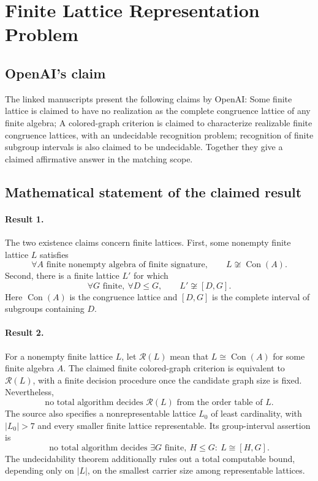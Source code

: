 \documentclass[11pt]{article}
\begin{document}
\section*{Finite Lattice Representation Problem}

\subsection{OpenAI's claim}
The linked manuscripts present the following claims by OpenAI: Some finite lattice is claimed to have no realization as the complete congruence lattice of any finite algebra; A colored-graph criterion is claimed to characterize realizable finite congruence lattices, with an undecidable recognition problem; recognition of finite subgroup intervals is also claimed to be undecidable. Together they give a claimed affirmative answer in the matching scope.

\subsection{Mathematical statement of the claimed result}
\paragraph{Result 1.} The two existence claims concern finite lattices. First, some nonempty finite lattice \(L\) satisfies
\[
 \forall A\text{ finite nonempty algebra of finite signature},\qquad
 L\not\cong\operatorname{Con}(A).
\]
Second, there is a finite lattice \(L'\) for which
\[
 \forall G\text{ finite},\ \forall D\le G,\qquad L'\not\cong[D,G].
\]
Here \(\operatorname{Con}(A)\) is the congruence lattice and \([D,G]\) is the complete interval of subgroups containing \(D\).

\paragraph{Result 2.} For a nonempty finite lattice \(L\), let \(\mathcal R(L)\) mean that \(L\cong\operatorname{Con}(A)\) for some finite algebra \(A\). The claimed finite colored-graph criterion is equivalent to \(\mathcal R(L)\), with a finite decision procedure once the candidate graph size is fixed. Nevertheless,
\[
 \text{no total algorithm decides }\mathcal R(L)\text{ from the order table of }L.
\]
The source also specifies a nonrepresentable lattice \(L_0\) of least cardinality, with \(|L_0|>7\) and every smaller finite lattice representable. Its group-interval assertion is
\[
 \text{no total algorithm decides }\exists G\text{ finite},\ H\le G:\ L\cong[H,G].
\]
The undecidability theorem additionally rules out a total computable bound, depending only on \(|L|\), on the smallest carrier size among representable lattices.
\end{document}

